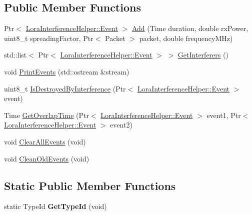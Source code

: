 \subsection*{Public Member Functions}
\begin{DoxyCompactItemize}
\item 
Ptr$<$ \hyperlink{classns3_1_1lorawan_1_1LoraInterferenceHelper_1_1Event}{Lora\+Interference\+Helper\+::\+Event} $>$ \hyperlink{classns3_1_1lorawan_1_1LoraInterferenceHelper_a17aef550d964edfff569c8ac5940a831}{Add} (Time duration, double rx\+Power, uint8\+\_\+t spreading\+Factor, Ptr$<$ Packet $>$ packet, double frequency\+M\+Hz)
\item 
std\+::list$<$ Ptr$<$ \hyperlink{classns3_1_1lorawan_1_1LoraInterferenceHelper_1_1Event}{Lora\+Interference\+Helper\+::\+Event} $>$ $>$ \hyperlink{classns3_1_1lorawan_1_1LoraInterferenceHelper_ae95585be5124685f9628d1b9e486a468}{Get\+Interferers} ()
\item 
void \hyperlink{classns3_1_1lorawan_1_1LoraInterferenceHelper_ade1d830e7be5745bbb9c93f890aef501}{Print\+Events} (std\+::ostream \&stream)
\item 
uint8\+\_\+t \hyperlink{classns3_1_1lorawan_1_1LoraInterferenceHelper_ad37985e0b3cbcd00bdce3b36e5729b37}{Is\+Destroyed\+By\+Interference} (Ptr$<$ \hyperlink{classns3_1_1lorawan_1_1LoraInterferenceHelper_1_1Event}{Lora\+Interference\+Helper\+::\+Event} $>$ event)
\item 
Time \hyperlink{classns3_1_1lorawan_1_1LoraInterferenceHelper_a29a3da1aa245b2ec068434ecca44ca75}{Get\+Overlap\+Time} (Ptr$<$ \hyperlink{classns3_1_1lorawan_1_1LoraInterferenceHelper_1_1Event}{Lora\+Interference\+Helper\+::\+Event} $>$ event1, Ptr$<$ \hyperlink{classns3_1_1lorawan_1_1LoraInterferenceHelper_1_1Event}{Lora\+Interference\+Helper\+::\+Event} $>$ event2)
\item 
void \hyperlink{classns3_1_1lorawan_1_1LoraInterferenceHelper_af3668bfeaf050393fae817f3bb9f3bdf}{Clear\+All\+Events} (void)
\item 
void \hyperlink{classns3_1_1lorawan_1_1LoraInterferenceHelper_a9b5c1a880cf496edb4d0e9163cb6c88f}{Clean\+Old\+Events} (void)
\end{DoxyCompactItemize}
\subsection*{Static Public Member Functions}
\begin{DoxyCompactItemize}
\item 
\mbox{\label{classns3_1_1lorawan_1_1LoraInterferenceHelper_a38f1a0c91dd0ee07d7b7926ba6e8afce}} 
static Type\+Id {\bfseries Get\+Type\+Id} (void)
\end{DoxyCompactItemize}



